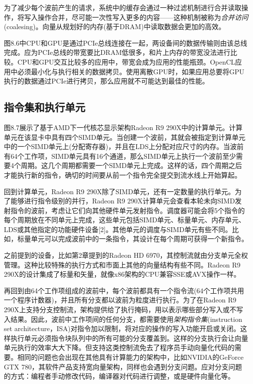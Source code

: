 为了减少每个波前产生的请求，系统中的缓存会通过一种过滤机制进行合并读取操作，将写入操作合并，尽可能一次性写入更多的内容——这种机制被称为\emph{合并访问}(coalesing)。向量从规划好的内存(基于DRAM)中读取数据会更加的高效。

图8.6中CPU和GPU是通过PCIe总线连接在一起，两设备间的数据传输则由该总线完成。应为PCIe总线的带宽要比DRAM低很多，和片上内存的带宽没法进行比较。CPU和GPU交互比较多的应用中，带宽会成为应用的性能瓶颈。OpenCL应用中必须最小化与执行相关的数据拷贝。使用离散GPU时，如果应用总要将GPU执行的数据通过PCIe进行拷贝，那么应用就不可能达到最佳的性能。

\subsection{指令集和执行单元}

图8.7展示了基于AMD下一代核芯显示架构Radeon R9 290X中的计算单元。计算单元在该显卡中具有四个SIMD单元。当创建一个波前，其就会被指定到计算单元中的一个SIMD单元上(分配寄存器)，并且在LDS上分配对应尺寸的内存。当波前有64个工作项，SIMD单元具有16个通道，那么SIMD单元上执行一个波前至少需要4个周期。这几个周期都需要一个SIMD单元上完成。这样的话，四个周期之后才能执行新的指令，确切的时间要从前一个指令完全提交到流水线上开始算起。


回到计算单元，Radeon R9 290X除了SIMD单元，还有一定数量的执行单元。为了能够进行指令级别的并行，Radeon R9 290X计算单元会查看本轮未向SIMD发射指令的波前，考虑让它们向其他硬件单元发射指令。调度器可能会将5个指令的每个周期放在不同单元上完成，这些单元包括SIMD单元、标量单元、内存单元、LDS或其他指定的功能硬件设备[2]。其他单元的调度与SIMD单元有些不同。比如，标量单元可以完成波前中的一条指令，其设计在每个周期可获得一个新指令。

之前提到的设备，比如第2章提到的Radeon HD 6970，其控制流就由分支单元全权管理。这种比较特殊的执行方式和市面上其他的向量结构有些不同。Radeon R9 290X的设计集成了标量和矢量，就像x86架构的CPU兼容SSE或AVX操作一样。

再回到由64个工作项组成的波前中，每个波前都具有一个指令流(64个工作项共用一个程序计数器)，并且所有分支都以波前为粒度进行执行。为了在Radeon R9 290X上支持分支控制流，架构提供给了执行掩码，用以表示哪些部分写入或不写入结果。因此，波前中工作项间的任何分支，都需要使用\emph{架构指令集}(instruction set architecture，ISA)对指令加以限制，将对应的操作的写入功能开启或关闭。这样执行单元必须指令块队列中的所有可能的分支覆盖到。这样的分支执行会让向量单元执行的效率大大下降。但支持这类控制流免去了程序员手动向量化代码的需要。相同的问题也会出现在其他具有计算能力的架构中，比如NVIDIA的GeForce GTX 780，其软件产品支持宽向量架构，同样也会遇到分支问题。应对分支问题的方式：编程者手动修改代码，编译器对代码进行调整，或是硬件向量化等。

